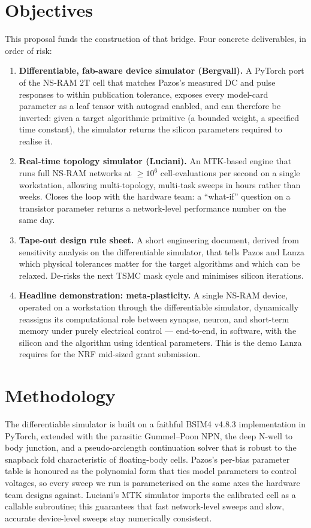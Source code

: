 \documentclass[fontsize=10pt]{article}
\begin{document}
\section{Objectives}
This proposal funds the construction of that bridge. Four concrete deliverables, in order of
risk:

\begin{enumerate}[leftmargin=1.5em,topsep=0.2em,itemsep=0.2em]
\item \textbf{Differentiable, fab-aware device simulator (Bergvall).} A PyTorch port of the
NS-RAM 2T cell that matches Pazos's measured DC and pulse responses to within publication
tolerance, exposes every model-card parameter as a leaf tensor with autograd enabled, and
can therefore be inverted: given a target algorithmic primitive (a bounded weight, a
specified time constant), the simulator returns the silicon parameters required to realise
it.
\item \textbf{Real-time topology simulator (Luciani).} An MTK-based engine that runs full
NS-RAM networks at $\geq 10^6$ cell-evaluations per second on a single workstation, allowing
multi-topology, multi-task sweeps in hours rather than weeks. Closes the loop with the
hardware team: a ``what-if'' question on a transistor parameter returns a
network-level performance number on the same day.
\item \textbf{Tape-out design rule sheet.} A short engineering document, derived from
sensitivity analysis on the differentiable simulator, that tells Pazos and Lanza which
physical tolerances matter for the target algorithms and which can be relaxed. De-risks
the next TSMC mask cycle and minimises silicon iterations.
\item \textbf{Headline demonstration: meta-plasticity.} A single NS-RAM device, operated
on a workstation through the differentiable simulator, dynamically reassigns its
computational role between synapse, neuron, and short-term memory under purely
electrical control --- end-to-end, in software, with the silicon and the
algorithm using identical parameters. This is the demo Lanza requires for the NRF
mid-sized grant submission.
\end{enumerate}

\section{Methodology}
The differentiable simulator is built on a faithful BSIM4 v4.8.3 implementation in
PyTorch, extended with the parasitic Gummel--Poon NPN, the deep N-well to body junction,
and a pseudo-arclength continuation solver that is robust to the snapback fold characteristic
of floating-body cells. Pazos's per-bias parameter table is honoured as the polynomial form
that ties model parameters to control voltages, so every sweep we run is parameterised on
the same axes the hardware team designs against. Luciani's MTK simulator imports the
calibrated cell as a callable subroutine; this guarantees that fast network-level sweeps
and slow, accurate device-level sweeps stay numerically consistent.
\end{document}
